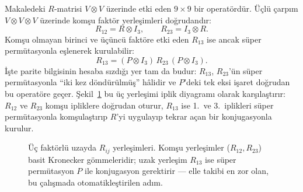 \documentclass[10pt]{math}
\numberwithin{equation}{section}
\theoremstyle{plain}
\theoremstyle{definition}
\begin{document}
Makaledeki $R$-matrisi $V\otimes V$ üzerinde etki eden $9\times 9$ bir
operatördür. Üçlü çarpım $V\otimes V\otimes V$ üzerinde komşu faktör
yerleşimleri doğrudandır:
\[
R_{12}=R\otimes I_3,\qquad R_{23}=I_3\otimes R.
\]
Komşu olmayan birinci ve üçüncü faktöre etki eden $R_{13}$ ise ancak süper
permütasyonla eşlenerek kurulabilir:
\[
R_{13}=(P\otimes I_3)\,R_{23}\,(P\otimes I_3).
\]
İşte parite bilgisinin hesaba sızdığı yer tam da budur: $R_{13}$, $R_{23}$'ün
süper permütasyonla ``iki kez döndürülmüş'' hâlidir ve $P$'deki tek eksi işaret
doğrudan bu operatöre geçer. Şekil~\ref{fig:place} bu üç yerleşimi iplik
diyagramı olarak karşılaştırır: $R_{12}$ ve $R_{23}$ komşu ipliklere doğrudan
oturur, $R_{13}$ ise 1.\ ve 3.\ iplikleri süper permütasyonla komşulaştırıp
$R$'yi uygulayıp tekrar açan bir konjugasyonla kurulur.

\begin{figure}[h]
\centering
{}
\caption{Üç faktörlü uzayda $R_{ij}$ yerleşimleri. Komşu yerleşimler ($R_{12},R_{23}$)
basit Kronecker gömmeleridir; uzak yerleşim $R_{13}$ ise süper permütasyon $P$
ile konjugasyon gerektirir --- elle takibi en zor olan, bu çalışmada
otomatikleştirilen adım.}
\label{fig:place}
\end{figure}
\end{document}
